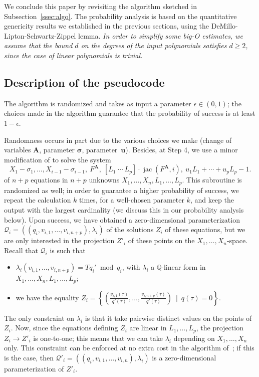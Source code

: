 \documentclass[12pt]{article}
\def\scrQ{\ensuremath{\mathscr{Q}}}
\def\mA{{\bm A}}
\DeclareMathOperator{\jac}{jac}
\def\Q{\mathbb{Q}}
\begin{document}
We conclude this paper by revisiting the algorithm sketched in
Subsection~\ref{ssec:algo}. The probability analysis is based on the
quantitative genericity results we established in the previous
sections, using the DeMillo-Lipton-Schwartz-Zippel lemma. {\em In order to
simplify some big-O estimates, we assume that the bound $d$ on the
degrees of the input polynomials satisfies $d \ge 2$, since the case
of linear polynomials is trivial.}


\subsection{Description of the pseudocode}

The algorithm is randomized and takes as input a parameter $\epsilon
\in (0,1)$; the choices made in the algorithm guarantee that the
probability of success is at least $1-\epsilon$. 

Randomness occurs in part due to the various choices we make (change
of variables $\mA$, parameter $\bm \sigma$, parameter~$\bm u$).
Besides, at Step 4, we use a minor modification of \cite[Algorithm
  2]{SH} to solve the system
\[
X_1 - \sigma_1, \dots, X_{i-1} - \sigma_{i-1},\ F^{\mA},\ [L_1~\cdots~L_p]\cdot \jac(F^{\mA}, i),\ u_1 L_1 + \cdots + u_p L_p -1.  
\]
of $n+p$ equations in $n+p$ unknowns
$X_1,\dots,X_n,L_1,\dots,L_p$. This subroutine is randomized as well;
in order to guarantee a higher probability of success, we repeat the
calculation $k$ times, for a well-chosen parameter $k$, and keep the
output with the largest cardinality (we discuss this in our
probability analysis below). Upon success, we have obtained a
zero-dimensional parameterization
$\scrQ_i=((q_i,v_{i,1},\dots,v_{i,n+p}),\lambda_i)$ of the solutions
$Z_i$ of these equations, but we are only interested in the projection
$Z'_i$ of these points on the $X_1,\dots,X_n$-space. Recall that
$\scrQ_i$ is such that
\begin{itemize}
\item $\lambda_i(v_{i,1},\dots,v_{i,n+p})=T q_i' \bmod q_i$, with
  $\lambda_i$ a $\Q$-linear form in $X_1,\dots,X_n,L_1,\dots,L_p$;
\item we have the equality $Z_i=\left \{\left(
  \frac{v_{i,1}(\tau)}{q'(\tau)},\dots,\frac{v_{i,n+p}(\tau)}{q'(\tau)}\right
  ) \ \mid \ q(\tau)=0 \right \}.$
\end{itemize}
The only constraint on $\lambda_i$ is that it take pairwise distinct
values on the points of $Z_i$. Now, since the equations defining $Z_i$
are linear in $L_1,\dots,L_p$, the projection $Z_i \to Z'_i$ is
one-to-one; this means that we can take $\lambda_i$ depending on
$X_1,\dots,X_n$ only. This constraint can be enforced at no extra cost
in the algorithm of~\cite{SH}; if this is the case, then
$\scrQ'_i=((q_i,v_{i,1},\dots,v_{i,n}),\lambda_i)$ is a
zero-dimensional parameterization of $Z'_i$.
\end{document}
